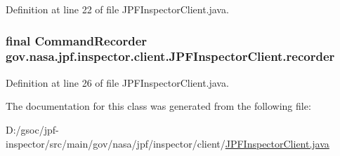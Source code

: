 Definition at line 22 of file J\+P\+F\+Inspector\+Client.\+java.

\subsubsection[{\texorpdfstring{recorder}{recorder}}]{\setlength{\rightskip}{0pt plus 5cm}final {\bf Command\+Recorder} gov.\+nasa.\+jpf.\+inspector.\+client.\+J\+P\+F\+Inspector\+Client.\+recorder\hspace{0.3cm}{\ttfamily [private]}}\hypertarget{classgov_1_1nasa_1_1jpf_1_1inspector_1_1client_1_1_j_p_f_inspector_client_a2c46859125dea92102448e2f64815a1b}{}\label{classgov_1_1nasa_1_1jpf_1_1inspector_1_1client_1_1_j_p_f_inspector_client_a2c46859125dea92102448e2f64815a1b}


Definition at line 26 of file J\+P\+F\+Inspector\+Client.\+java.



The documentation for this class was generated from the following file\+:\begin{DoxyCompactItemize}
\item 
D\+:/gsoc/jpf-\/inspector/src/main/gov/nasa/jpf/inspector/client/\hyperlink{_j_p_f_inspector_client_8java}{J\+P\+F\+Inspector\+Client.\+java}\end{DoxyCompactItemize}
